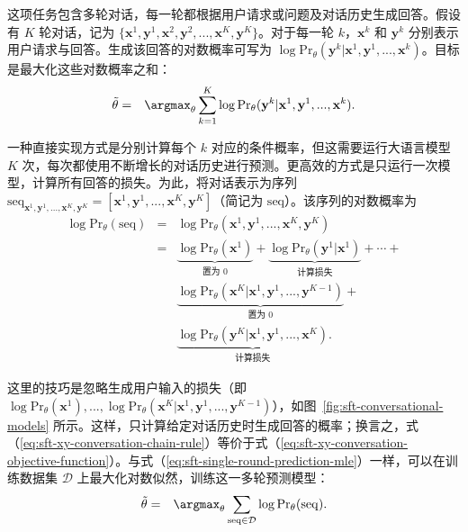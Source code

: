 这项任务包含多轮对话，每一轮都根据用户请求或问题及对话历史生成回答。假设有 $K$ 轮对话，记为 $\{\mathbf{x}^1,\mathbf{y}^1,\mathbf{x}^2,\mathbf{y}^2,...,\mathbf{x}^K,\mathbf{y}^K\}$。对于每一轮 $k$，$\mathbf{x}^k$ 和 $\mathbf{y}^k$ 分别表示用户请求与回答。生成该回答的对数概率可写为 $\log \mathrm{Pr}_{\theta}(\mathbf{y}^k|\mathbf{x}^1,\mathbf{y}^1,...,\mathbf{x}^k)$。目标是最大化这些对数概率之和：
\begin{eqnarray}
\tilde{\theta} & = & \argmax_{\theta} \sum_{k=1}^{K} \log \mathrm{Pr}_{\theta}(\mathbf{y}^k|\mathbf{x}^1,\mathbf{y}^1,...,\mathbf{x}^k). \label{eq:sft-xy-conversation-objective-function}
\end{eqnarray}

一种直接实现方式是分别计算每个 $k$ 对应的条件概率，但这需要运行大语言模型 $K$ 次，每次都使用不断增长的对话历史进行预测。更高效的方式是只运行一次模型，计算所有回答的损失。为此，将对话表示为序列 $\mathrm{seq}_{\mathbf{x}^1,\mathbf{y}^1,...,\mathbf{x}^K,\mathbf{y}^K} = [\mathbf{x}^1,\mathbf{y}^1,...,\mathbf{x}^K,\mathbf{y}^K]$（简记为 $\mathrm{seq}$）。该序列的对数概率为
\begin{eqnarray}
\log \mathrm{Pr}_{\theta}(\mathrm{seq}) & = & \log \mathrm{Pr}_{\theta}(\mathbf{x}^1,\mathbf{y}^1,...,\mathbf{x}^K,\mathbf{y}^K) \nonumber \\
                                        & = & \underbrace{\log \mathrm{Pr}_{\theta}(\mathbf{x}^1)}_{\text{置为 $0$}} + \underbrace{\log \mathrm{Pr}_{\theta}(\mathbf{y}^1|\mathbf{x}^1)}_{\text{计算损失}} + \cdots + \nonumber \\
                                        &   & \underbrace{\log \mathrm{Pr}_{\theta}(\mathbf{x}^K|\mathbf{x}^1,\mathbf{y}^1,...,\mathbf{y}^{K-1})}_{\text{置为 $0$}} + \nonumber \\
                                        &   & \underbrace{\log \mathrm{Pr}_{\theta}(\mathbf{y}^K|\mathbf{x}^1,\mathbf{y}^1,...,\mathbf{x}^K)}_{\text{计算损失}}. \label{eq:sft-xy-conversation-chain-rule}
\end{eqnarray}

这里的技巧是忽略生成用户输入的损失（即 $\log \mathrm{Pr}_{\theta}(\mathbf{x}^1),...,\allowbreak \log \mathrm{Pr}_{\theta}(\mathbf{x}^K|\mathbf{x}^1,\mathbf{y}^1,...,\mathbf{y}^{K-1})$），如图~\ref{fig:sft-conversational-models} 所示。这样，只计算给定对话历史时生成回答的概率；换言之，式（\ref{eq:sft-xy-conversation-chain-rule}）等价于式（\ref{eq:sft-xy-conversation-objective-function}）。与式（\ref{eq:sft-single-round-prediction-mle}）一样，可以在训练数据集 $\mathcal{D}$ 上最大化对数似然，训练这一多轮预测模型：
\begin{eqnarray}
\tilde{\theta} & = & \argmax_{\theta} \sum_{\mathrm{seq} \in \mathcal{D}} \log \mathrm{Pr}_{\theta}(\mathrm{seq}).
\end{eqnarray}

